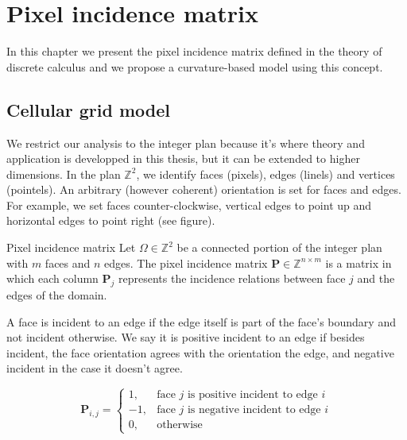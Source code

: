 \chapter{Pixel incidence matrix}
\label{app2:pixel-incidence-matrix}

In this chapter we present the pixel incidence matrix defined in the theory of discrete calculus and we propose a curvature-based model using this concept.

\section{Cellular grid model}

We restrict our analysis to the integer plan because it's where theory and application is developped in this thesis, but it can be extended to higher dimensions. In the plan $\mathbb{Z}^2$, we identify faces (pixels), edges (linels) and vertices (pointels). An arbitrary (however coherent) orientation is set for faces and edges. For example, we set faces counter-clockwise, vertical edges to point up and horizontal edges to point right (see figure).

\begin{definition}{Pixel incidence matrix}
	Let $\Omega \in \mathbb{Z}^2$ be a connected portion of the integer plan with $m$ faces and $n$ edges. The pixel incidence matrix $\mathbf{P} \in \mathbb{Z}^{n \times m}$ is a matrix in which each column $\mathbf{P} _j$ represents the incidence relations between face $j$ and the edges of the domain.
\end{definition}

A face is incident to an edge if the edge itself is part of the face's boundary and not incident otherwise. We say it is positive incident to an edge if besides incident, the face orientation  agrees with the orientation the edge, and negative incident in the case it doesn't agree.

\[
\mathbf{P} _{i,j} = \left\{ \begin{array}{ll}
	1, & \text{face $j$ is positive incident to edge $i$}\\
	-1, & \text{face $j$ is negative incident to edge $i$}\\	
	0, & \text{otherwise}
\end{array}\right.
\]

